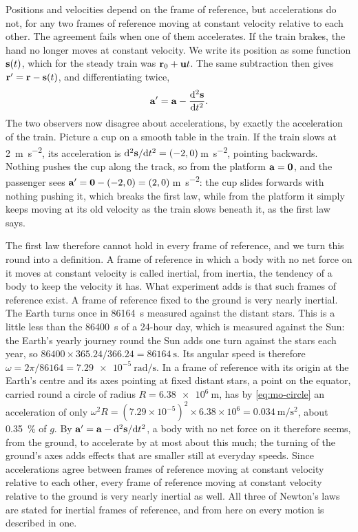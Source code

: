 Positions and velocities depend on the frame of reference, but
accelerations do not, for any two frames of reference moving at constant
velocity relative to each other. The agreement fails when one of them
accelerates. If the train brakes, the hand no longer moves at constant
velocity. We write its position as some function $\bm{\mathrm{s}}(t)$, which for
the steady train was $\bm{\mathrm{r}}_0 + \bm{\mathrm{u}}t$. The same subtraction then
gives $\bm{\mathrm{r}}' = \bm{\mathrm{r}} - \bm{\mathrm{s}}(t)$, and differentiating twice,
\begin{equation*}
   \bm{\mathrm{a}}' = \bm{\mathrm{a}} - \frac{\mathrm{d}^2\bm{\mathrm{s}}}{\mathrm{d} t^2} .
\end{equation*}
The two observers now disagree about accelerations, by exactly the
acceleration of the train. Picture a cup on a smooth table in the train.
If the train slows at \SI{2}{\metre\per\second\squared}, its acceleration
is $\mathrm{d}^2\bm{\mathrm{s}}/\mathrm{d} t^2 = (-2, 0)$\,\si{\metre\per\second\squared},
pointing backwards. Nothing pushes the cup along the track, so from the
platform $\bm{\mathrm{a}} = \bm{\mathrm{0}}$, and the passenger sees $\bm{\mathrm{a}}' = \bm{\mathrm{0}} -
(-2, 0) = (2, 0)$\,\si{\metre\per\second\squared}: the cup slides
forwards with nothing pushing it, which breaks the first law, while from the platform it simply
keeps moving at its old velocity as the train slows beneath it, as the
first law says.

The first law therefore cannot hold in every frame of reference, and we
turn this round into a definition. A frame of reference in which a body
with no net force on it moves at constant velocity is called inertial,
from inertia, the tendency of a body to keep the velocity it has. What
experiment adds is that such frames of reference exist. A frame of
reference fixed to the ground is very nearly inertial. The Earth turns
once in \SI{86164}{\second} measured against the distant stars. This is
a little less than the \SI{86400}{\second} of a 24-hour day, which is
measured against the Sun: the Earth's yearly journey round the Sun adds
one turn against the stars each year, so $86400\times365.24/366.24 =
\SI{86164}{\second}$. Its angular speed is therefore $\omega = 2\pi/86164
= \SI{7.29e-5}{\radian\per\second}$. In a frame of reference with its
origin at the Earth's centre and its axes pointing at fixed distant
stars, a point on the equator, carried round a circle of radius $R =
\SI{6.38e6}{\metre}$, has by \cref{eq:mo-circle} an acceleration of only
$\omega^2 R = (7.29\times10^{-5})^2\times6.38\times10^6 =
\SI{0.034}{\metre\per\second\squared}$, about \SI{0.35}{\percent} of
$g$. By $\bm{\mathrm{a}}' = \bm{\mathrm{a}} - \mathrm{d}^2\bm{\mathrm{s}}/\mathrm{d} t^2$, a body with no net
force on it therefore seems, from the ground, to accelerate by at most
about this much; the turning of the ground's axes adds effects that are
smaller still at everyday speeds.
Since accelerations agree between frames of reference moving at constant
velocity relative to each other, every frame of reference moving at
constant velocity relative to the ground is very nearly inertial as well. All three
of Newton's laws are stated for inertial frames of reference, and from
here on every motion is described in one.

